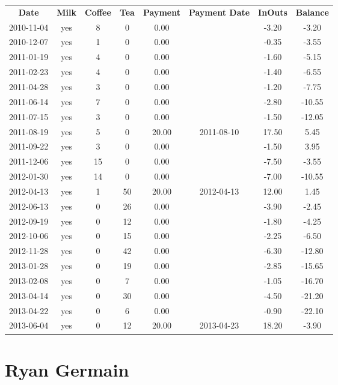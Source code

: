 \begin{center}
\begin{tabular}{cccccccc}
\textbf{Date} & \textbf{Milk} & \textbf{Coffee} & \textbf{Tea} & \textbf{Payment} & \textbf{Payment Date} & \textbf{InOuts} & \textbf{Balance} \\
2010-11-04 & yes &  8 &  0 &  0.00 &  & -3.20 &  -3.20\\ 
2010-12-07 & yes &  1 &  0 &  0.00 &  & -0.35 &  -3.55\\ 
2011-01-19 & yes &  4 &  0 &  0.00 &  & -1.60 &  -5.15\\ 
2011-02-23 & yes &  4 &  0 &  0.00 &  & -1.40 &  -6.55\\ 
2011-04-28 & yes &  3 &  0 &  0.00 &  & -1.20 &  -7.75\\ 
2011-06-14 & yes &  7 &  0 &  0.00 &  & -2.80 & -10.55\\ 
2011-07-15 & yes &  3 &  0 &  0.00 &  & -1.50 & -12.05\\ 
2011-08-19 & yes &  5 &  0 & 20.00 & 2011-08-10 & 17.50 &   5.45\\ 
2011-09-22 & yes &  3 &  0 &  0.00 &  & -1.50 &   3.95\\ 
2011-12-06 & yes & 15 &  0 &  0.00 &  & -7.50 &  -3.55\\ 
2012-01-30 & yes & 14 &  0 &  0.00 &  & -7.00 & -10.55\\ 
2012-04-13 & yes &  1 & 50 & 20.00 & 2012-04-13 & 12.00 &   1.45\\ 
2012-06-13 & yes &  0 & 26 &  0.00 &  & -3.90 &  -2.45\\ 
2012-09-19 & yes &  0 & 12 &  0.00 &  & -1.80 &  -4.25\\ 
2012-10-06 & yes &  0 & 15 &  0.00 &  & -2.25 &  -6.50\\ 
2012-11-28 & yes &  0 & 42 &  0.00 &  & -6.30 & -12.80\\ 
2013-01-28 & yes &  0 & 19 &  0.00 &  & -2.85 & -15.65\\ 
2013-02-08 & yes &  0 &  7 &  0.00 &  & -1.05 & -16.70\\ 
2013-04-14 & yes &  0 & 30 &  0.00 &  & -4.50 & -21.20\\ 
2013-04-22 & yes &  0 &  6 &  0.00 &  & -0.90 & -22.10\\ 
2013-06-04 & yes &  0 & 12 & 20.00 & 2013-04-23 & 18.20 &  -3.90
\end{tabular}
\end{center}

\section{Ryan Germain}

